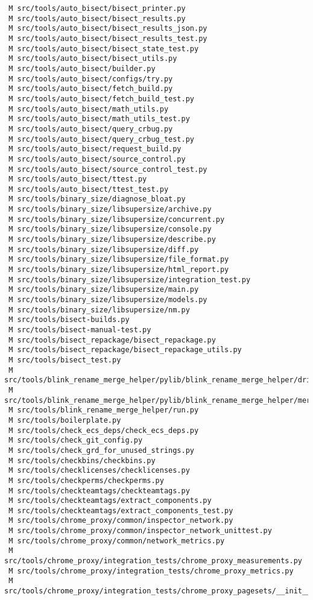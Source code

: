 \documentclass{article}
\begin{document}
\begin{verbatim}
 M src/tools/auto_bisect/bisect_printer.py
 M src/tools/auto_bisect/bisect_results.py
 M src/tools/auto_bisect/bisect_results_json.py
 M src/tools/auto_bisect/bisect_results_test.py
 M src/tools/auto_bisect/bisect_state_test.py
 M src/tools/auto_bisect/bisect_utils.py
 M src/tools/auto_bisect/builder.py
 M src/tools/auto_bisect/configs/try.py
 M src/tools/auto_bisect/fetch_build.py
 M src/tools/auto_bisect/fetch_build_test.py
 M src/tools/auto_bisect/math_utils.py
 M src/tools/auto_bisect/math_utils_test.py
 M src/tools/auto_bisect/query_crbug.py
 M src/tools/auto_bisect/query_crbug_test.py
 M src/tools/auto_bisect/request_build.py
 M src/tools/auto_bisect/source_control.py
 M src/tools/auto_bisect/source_control_test.py
 M src/tools/auto_bisect/ttest.py
 M src/tools/auto_bisect/ttest_test.py
 M src/tools/binary_size/diagnose_bloat.py
 M src/tools/binary_size/libsupersize/archive.py
 M src/tools/binary_size/libsupersize/concurrent.py
 M src/tools/binary_size/libsupersize/console.py
 M src/tools/binary_size/libsupersize/describe.py
 M src/tools/binary_size/libsupersize/diff.py
 M src/tools/binary_size/libsupersize/file_format.py
 M src/tools/binary_size/libsupersize/html_report.py
 M src/tools/binary_size/libsupersize/integration_test.py
 M src/tools/binary_size/libsupersize/main.py
 M src/tools/binary_size/libsupersize/models.py
 M src/tools/binary_size/libsupersize/nm.py
 M src/tools/bisect-builds.py
 M src/tools/bisect-manual-test.py
 M src/tools/bisect_repackage/bisect_repackage.py
 M src/tools/bisect_repackage/bisect_repackage_utils.py
 M src/tools/bisect_test.py
 M src/tools/blink_rename_merge_helper/pylib/blink_rename_merge_helper/driver.py
 M src/tools/blink_rename_merge_helper/pylib/blink_rename_merge_helper/merge.py
 M src/tools/blink_rename_merge_helper/run.py
 M src/tools/boilerplate.py
 M src/tools/check_ecs_deps/check_ecs_deps.py
 M src/tools/check_git_config.py
 M src/tools/check_grd_for_unused_strings.py
 M src/tools/checkbins/checkbins.py
 M src/tools/checklicenses/checklicenses.py
 M src/tools/checkperms/checkperms.py
 M src/tools/checkteamtags/checkteamtags.py
 M src/tools/checkteamtags/extract_components.py
 M src/tools/checkteamtags/extract_components_test.py
 M src/tools/chrome_proxy/common/inspector_network.py
 M src/tools/chrome_proxy/common/inspector_network_unittest.py
 M src/tools/chrome_proxy/common/network_metrics.py
 M src/tools/chrome_proxy/integration_tests/chrome_proxy_measurements.py
 M src/tools/chrome_proxy/integration_tests/chrome_proxy_metrics.py
 M src/tools/chrome_proxy/integration_tests/chrome_proxy_pagesets/__init__.py

\end{verbatim}
\end{document}
